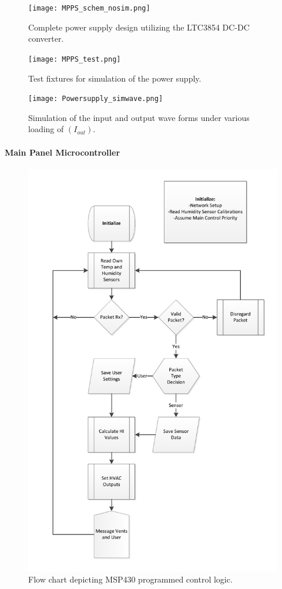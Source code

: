 \begin{figure}[htbp]
\centering
\texttt{[image: MPPS\_schem\_nosim.png]}
\caption{Complete power supply design utilizing the LTC3854 DC-DC converter.}
\label{fig:MPPS_schem_nosim}
\end{figure}

\begin{figure}[htbp]
\centering
\texttt{[image: MPPS\_test.png]}
\caption{Test fixtures for simulation of the power supply.}
\label{fig:MPPS_test}
\end{figure}

\begin{figure}[htbp]
\centering
\texttt{[image: Powersupply\_simwave.png]}
\caption{Simulation of the input and output wave forms under various loading of $(I_{out})$.}
\label{fig:powersupply_simwave}
\end{figure}
\paragraph{Main Panel Microcontroller}
\begin{figure}[htbp]
\centering
\includegraphics[height=.9\textheight]{maincntl_flow.pdf}
\caption{Flow chart depicting MSP430 programmed control logic.}
\label{fig:maincntl_flow}
\end{figure}

